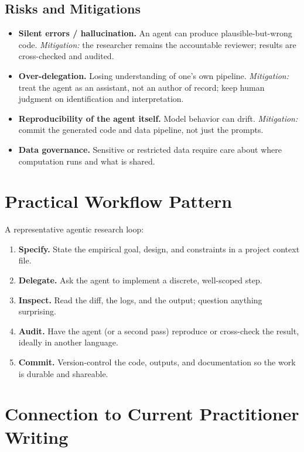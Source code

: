 \documentclass[11pt]{article}
\begin{document}
\subsection{Risks and Mitigations}
\begin{itemize}[leftmargin=1.4em]
  \item \textbf{Silent errors / hallucination.} An agent can produce
        plausible-but-wrong code. \emph{Mitigation:} the researcher remains
        the accountable reviewer; results are cross-checked and audited.
  \item \textbf{Over-delegation.} Losing understanding of one's own
        pipeline. \emph{Mitigation:} treat the agent as an assistant, not an
        author of record; keep human judgment on identification and
        interpretation.
  \item \textbf{Reproducibility of the agent itself.} Model behavior can
        drift. \emph{Mitigation:} commit the generated code and data
        pipeline, not just the prompts.
  \item \textbf{Data governance.} Sensitive or restricted data require
        care about where computation runs and what is shared.
\end{itemize}

\section{Practical Workflow Pattern}

A representative agentic research loop:
\begin{enumerate}[leftmargin=1.5em]
  \item \textbf{Specify.} State the empirical goal, design, and constraints
        in a project context file.
  \item \textbf{Delegate.} Ask the agent to implement a discrete,
        well-scoped step.
  \item \textbf{Inspect.} Read the diff, the logs, and the output; question
        anything surprising.
  \item \textbf{Audit.} Have the agent (or a second pass) reproduce or
        cross-check the result, ideally in another language.
  \item \textbf{Commit.} Version-control the code, outputs, and
        documentation so the work is durable and shareable.
\end{enumerate}

\section{Connection to Current Practitioner Writing}
\end{document}
